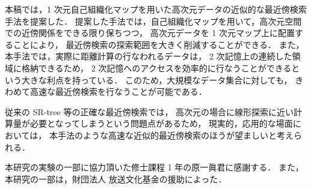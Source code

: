 本稿では，1 次元自己組織化マップを用いた高次元データの近似的な最近傍検索手法を提案した．
提案した手法では，自己組織化マップを用いて，高次元空間での近傍関係をできる限り保ちつつ，
高次元データを 1 次元マップ上に配置することにより，
最近傍検索の探索範囲を大きく削減することができる．
また，本手法では，実際に距離計算の行なわれるデータは，
2 次記憶上の連続した領域に格納できるため，
2 次記憶へのアクセスを効率的に行なうことができるという大きな利点を持っている．
このため，大規模なデータ集合に対しても，
きわめて高速な最近傍検索を行なうことが可能である．

従来の SR-tree 等の正確な最近傍検索では，
高次元の場合に線形探索に近い計算量が必要となってしまうという問題点があるため，
現実的，応用的な場面においては，
本手法のような高速な近似的最近傍検索のほうが望ましいと考えられる．


\acknowledgment

本研究の実験の一部に協力頂いた修士課程 1 年の原一眞君に感謝する．
また，本研究の一部は，財団法人 放送文化基金の援助によった．





\begin{biography}


\end{biography}



